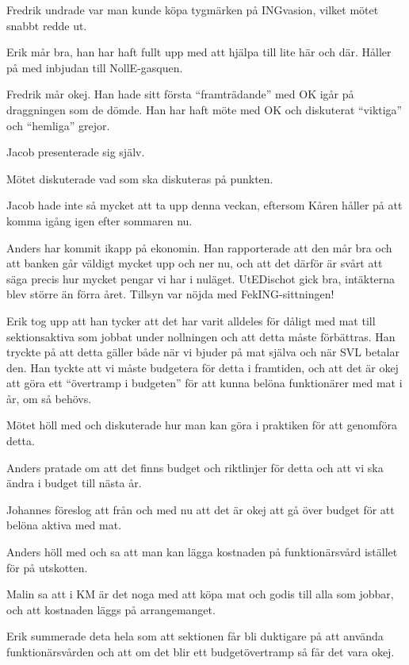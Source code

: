 \documentclass[10pt]{article}
\begin{document}
\begin{paragrafer}
\begin{paragrafer}
Fredrik undrade var man kunde köpa tygmärken på INGvasion, vilket mötet snabbt redde ut.

Erik mår bra, han har haft fullt upp med att hjälpa till lite här och där. Håller på med inbjudan till NollE-gasquen.

Fredrik mår okej. Han hade sitt första ``framträdande'' med OK igår på draggningen som de dömde. Han har haft möte med OK och diskuterat ``viktiga'' och ``hemliga'' grejor.

Jacob presenterade sig själv.

Mötet diskuterade vad som ska diskuteras på punkten.

Jacob hade inte så mycket att ta upp denna veckan, eftersom Kåren håller på att komma igång igen efter sommaren nu.

Anders har kommit ikapp på ekonomin. Han rapporterade att den mår bra och att banken går väldigt mycket upp och ner nu, och att det därför är svårt att säga precis hur mycket pengar vi har i nuläget. UtEDischot gick bra, intäkterna blev större än förra året. Tillsyn var nöjda med FekING-sittningen!

\end{paragrafer}


Erik tog upp att han tycker att det har varit alldeles för dåligt med mat till sektionsaktiva som jobbat under nollningen och att detta måste förbättras. Han tryckte på att detta gäller både när vi bjuder på mat själva och när SVL betalar den. Han tyckte att vi måste budgetera för detta i framtiden, och att det är okej att göra ett ``övertramp i budgeten'' för att kunna belöna funktionärer med mat i år, om så behövs.

Mötet höll med och diskuterade hur man kan göra i praktiken för att genomföra detta.

Anders pratade om att det finns budget och riktlinjer för detta och att vi ska ändra i budget till nästa år.

Johannes föreslog att från och med nu att det är okej att gå över budget för att belöna aktiva med mat.

Anders höll med och sa att man kan lägga kostnaden på funktionärsvård istället för på utskotten.

Malin sa att i KM är det noga med att köpa mat och godis till alla som jobbar, och att kostnaden läggs på arrangemanget.

Erik summerade deta hela som att sektionen får bli duktigare på att använda funktionärsvården och att om det blir ett budgetövertramp så får det vara okej.


\end{paragrafer}
\end{document}

